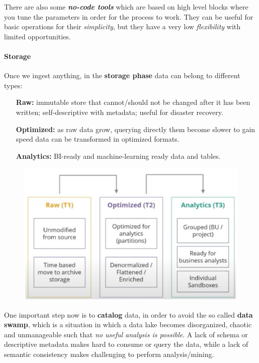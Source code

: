 There are also some \textbf{\textit{no-code tools}} which are based on high level blocks where you tune the parameters in order for the process to work. They can be useful for basic operations for their \textit{simplicity}, but they have a very low \textit{flexibility} with limited opportunities.

\paragraph{Storage}
Once we ingest anything, in the \textbf{storage phase} data can belong to different types:
\begin{itemize}
    \item[\textbf{Raw:}] immutable store that cannot/should not be changed after it has been written; self-descriptive with metadata; useful for disaster recovery.
    \item[\textbf{Optimized:}] as raw data grow, querying directly them become slower to gain speed data can be transformed in optimized formats.
    \item[\textbf{Analytics:}] BI-ready and machine-learning ready data and tables.
\end{itemize}

\begin{figure}[ht!]
    \centering
    \includegraphics[scale=0.8]{images/DL_data_types.png}
\end{figure}

One important step now is to \textbf{catalog} data, in order to avoid the so called \textbf{data swamp}, which is a situation in which a data lake becomes disorganized, chaotic and unmanageable such that \textit{no useful analysis is possible}. A lack of schema or descriptive metadata makes hard to consume or query the data, while a lack of semantic consistency makes challenging to perform analysis/mining.

